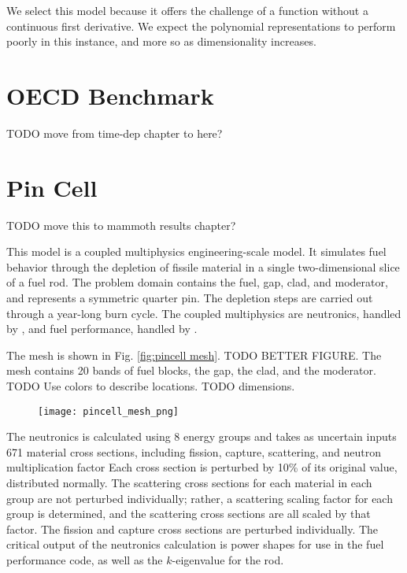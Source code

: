 We select this model because it offers the challenge of a function
without a continuous first derivative.  We expect the polynomial representations to perform poorly
in this instance, and more so as dimensionality increases.
\section{OECD Benchmark}
TODO move from time-dep chapter to here?

\section{Pin Cell}\label{mod:pincell}
TODO move this to mammoth results chapter?

This model is a coupled multiphysics engineering-scale model.  It simulates fuel behavior through the depletion of fissile material
in a single two-dimensional slice of a fuel rod.  The problem domain contains the fuel, gap, clad, and
moderator, and represents a symmetric quarter pin.  The depletion steps are carried out through a year-long
burn cycle.
The coupled multiphysics are neutronics, handled by \rattlesnake{}, and fuel performance, handled by
\bison{}.  

The mesh is shown in Fig. \ref{fig:pincell mesh}.  TODO BETTER FIGURE.  The mesh contains 20 bands of fuel
blocks, the gap, the clad, and the moderator.  TODO Use colors to describe locations.  TODO dimensions.
\begin{figure}[htb]
  \centering
  \texttt{[image: pincell\_mesh\_png]}
\end{figure}

The neutronics is calculated using 8 energy groups and takes as uncertain inputs 671 material cross
sections, including fission, capture, scattering, and neutron multiplication factor  Each cross section is
perturbed by 10\% of its original value, distributed normally.  The scattering cross
sections for each material in each group are not perturbed individually; rather, a scattering scaling factor
for each group is determined, and the scattering cross sections are all scaled by that factor.  The fission
and capture cross sections are perturbed individually.  The critical output of the neutronics calculation is
power shapes for use in the fuel performance code, as well as the $k$-eigenvalue for the rod.

